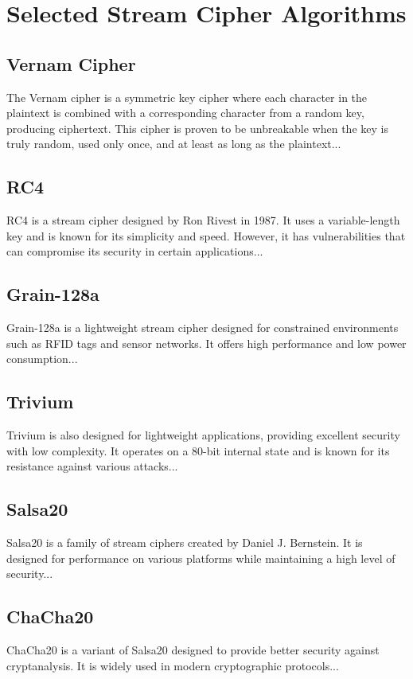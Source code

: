 \chapter{Selected Stream Cipher Algorithms}
\section{Vernam Cipher}
The Vernam cipher is a symmetric key cipher where each character in the plaintext is combined with a corresponding character from a random key, producing ciphertext. This cipher is proven to be unbreakable when the key is truly random, used only once, and at least as long as the plaintext...

\section{RC4}
RC4 is a stream cipher designed by Ron Rivest in 1987. It uses a variable-length key and is known for its simplicity and speed. However, it has vulnerabilities that can compromise its security in certain applications...

\section{Grain-128a}
Grain-128a is a lightweight stream cipher designed for constrained environments such as RFID tags and sensor networks. It offers high performance and low power consumption...

\section{Trivium}
Trivium is also designed for lightweight applications, providing excellent security with low complexity. It operates on a 80-bit internal state and is known for its resistance against various attacks...

\section{Salsa20}
Salsa20 is a family of stream ciphers created by Daniel J. Bernstein. It is designed for performance on various platforms while maintaining a high level of security...

\section{ChaCha20}
ChaCha20 is a variant of Salsa20 designed to provide better security against cryptanalysis. It is widely used in modern cryptographic protocols...

